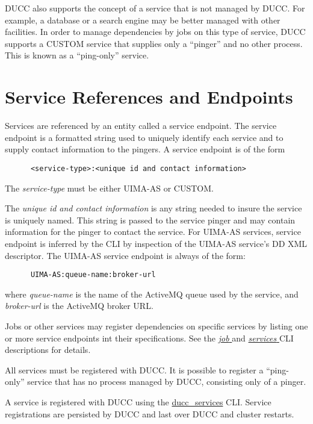       DUCC also supports the concept of a service that is not managed by DUCC.  For example, a
      database or a search engine may be better managed with other facilities.  In order to manage
      dependencies by jobs on this type of service, DUCC supports a CUSTOM service that supplies
      only a ``pinger'' and no other process.  This is known as a ``ping-only'' service.

      \section{Service References and Endpoints} 
      \label{sec:service.endpoints}
      Services are referenced by an entity called a service
      endpoint. The service endpoint is a formatted string used to uniquely identify each
      service and to supply contact information to the pingers.  A service endpoint
      is of the form 
\begin{verbatim}
      <service-type>:<unique id and contact information>
\end{verbatim}
      
      The {\em service-type} must be either UIMA-AS or CUSTOM.
      
      The {\em unique id and contact information} is any string needed to insure the service is
      uniquely named.  This string is passed to the service pinger and may contain 
      information for the pinger to contact the service.  For UIMA-AS services, service endpoint is
      inferred by the CLI by inspection of the UIMA-AS service's DD XML descriptor.  The UIMA-AS
      service endpoint is always of the form:
\begin{verbatim}
      UIMA-AS:queue-name:broker-url
\end{verbatim}
      where {\em queue-name} is the name of the ActiveMQ queue used by the service, and {\em broker-url}
      is the ActiveMQ broker URL.

      Jobs or other services may register dependencies on specific services by listing one or more
      service endpoints int their specifications. See the 
      \hyperref[sec:cli.ducc-submit]{\em job } and 
      \hyperref[sec:cli.ducc-services]{\em services } CLI descriptions for details.
           
      All services must be registered with DUCC.  It is
      possible to register a ``ping-only'' service that has no process managed by DUCC,
      consisting only of a pinger.  
            
      A service is registered with DUCC using the
      \hyperref[sec:cli.ducc-services]{ducc\_services} CLI. Service registrations are persisted by
      DUCC and last over DUCC and cluster restarts.

